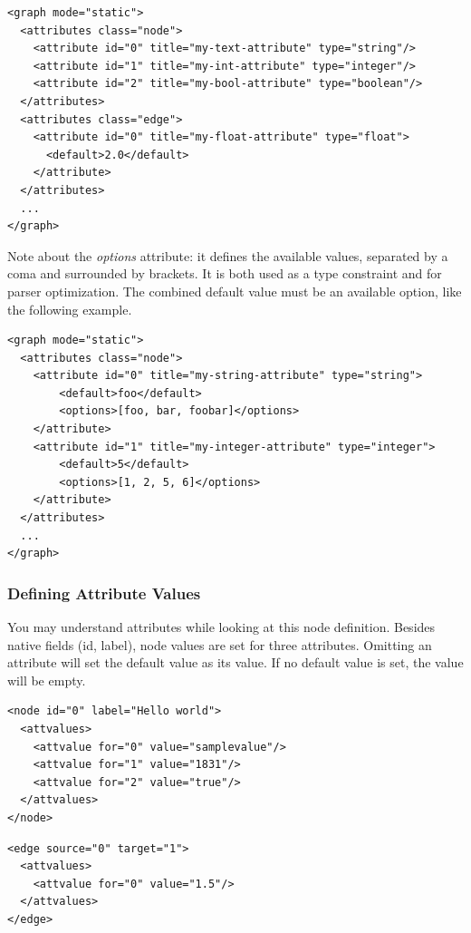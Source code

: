\documentclass[a4paper,10pt]{article}
\begin{document}
\lstset{ style=gexf }
\begin{lstlisting}[caption={Attributes Definition},label=attributesDef]
<graph mode="static">
  <attributes class="node">
    <attribute id="0" title="my-text-attribute" type="string"/>
    <attribute id="1" title="my-int-attribute" type="integer"/>
    <attribute id="2" title="my-bool-attribute" type="boolean"/>
  </attributes>
  <attributes class="edge">
    <attribute id="0" title="my-float-attribute" type="float">
      <default>2.0</default>
    </attribute>
  </attributes>
  ...
</graph>
\end{lstlisting}

Note about the \textit{options} attribute: it defines the available values, separated by a coma and surrounded by brackets. It is both used as a type constraint and for parser optimization. The combined default value must be an available option, like the following example.

\lstset{ style=gexf }
\begin{lstlisting}[caption={Options},label=optionsDef]
<graph mode="static">
  <attributes class="node">
    <attribute id="0" title="my-string-attribute" type="string">
        <default>foo</default>
        <options>[foo, bar, foobar]</options>
    </attribute>
    <attribute id="1" title="my-integer-attribute" type="integer">
        <default>5</default>
        <options>[1, 2, 5, 6]</options>
    </attribute>
  </attributes>
  ...
</graph>
\end{lstlisting}

\subsubsection{Defining Attribute Values}

You may understand attributes while looking at this node definition. Besides native fields (id, label), node values are set for three attributes. Omitting an attribute will set the default value as its value. If no default value is set, the value will be empty.

\lstset{ style=gexf }
\begin{lstlisting}[caption={Node Attributes},label=nodeattributes]
<node id="0" label="Hello world">
  <attvalues>
    <attvalue for="0" value="samplevalue"/>
    <attvalue for="1" value="1831"/>
    <attvalue for="2" value="true"/>
  </attvalues>
</node>
\end{lstlisting}

\lstset{ style=gexf }
\begin{lstlisting}[caption={Edge Attributes},label=edgeattributes]
<edge source="0" target="1">
  <attvalues>
    <attvalue for="0" value="1.5"/>
  </attvalues>
</edge>
\end{lstlisting}
\end{document}

